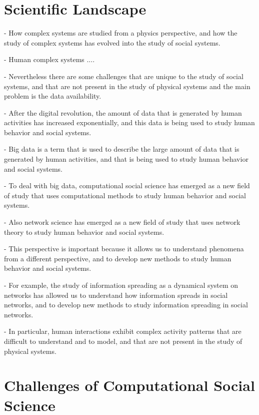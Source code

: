 \setcounter{page}{0}

\section{\label{sec:scie_lands} Scientific Landscape}

- How complex systems are studied from a physics perspective, and how the study of complex systems has evolved into the study of social systems.

- Human complex systems ....

- Nevertheless there are some challenges that are unique to the study of social systems, and that are not present in the study of physical systems and the main problem is the data availability.

- After the digital revolution, the amount of data that is generated by human activities has increased exponentially, and this data is being used to study human behavior and social systems. 

- Big data is a term that is used to describe the large amount of data that is generated by human activities, and that is being used to study human behavior and social systems.

- To deal with big data, computational social science has emerged as a new field of study that uses computational methods to study human behavior and social systems.

- Also network science has emerged as a new field of study that uses network theory to study human behavior and social systems.

- This perspective is important because it allows us to understand phenomena from a different perspective, and to develop new methods to study human behavior and social systems. 

- For example, the study of information spreading as a dynamical system on networks has allowed us to understand how information spreads in social networks, and to develop new methods to study information spreading in social networks.

- In particular, human interactions exhibit complex activity patterns that are difficult to understand and to model, and that are not present in the study of physical systems.

\section{\label{sec:Challenges of Computational Social Science} Challenges of Computational Social Science}

